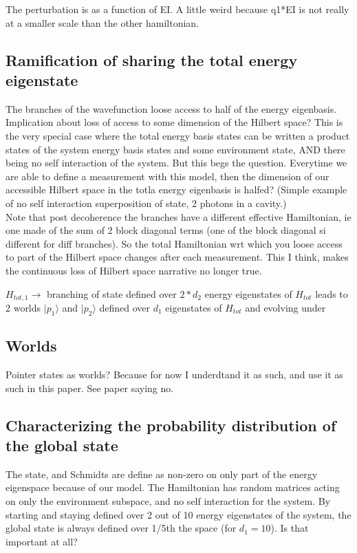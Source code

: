 \documentclass{article}
\begin{document}
The perturbation is as a function of EI.
A little weird because q1*EI is not really at a smaller scale than the other hamiltonian.


\subsection{Ramification of sharing the total energy eigenstate}
The branches of the wavefunction loose access to half of the energy eigenbasis. 
Implication about loss of access to some dimension of the Hilbert space? 
This is the very special case where the total energy basis states can be written a product states of the system energy basis states and some environment state, AND there being no self interaction of the system.
But this begs the question. Everytime we are able to define a measurement with this model, then the dimension of our accessible Hilbert space in the totla energy eigenbasis is halfed? (Simple example of no self interaction superposition of state, 2 photons in a cavity.) \\
Note that post decoherence the branches have a different effective Hamiltonian, ie one made of the sum of 2 block diagonal terms (one of the block diagonal si different for diff branches). So the total Hamiltonian wrt which you loose access to part of the Hilbert space changes after each measurement. This I think, makes the continuous loss of Hilbert space narrative no longer true. 

$H_{tot,1}\rightarrow$ branching of state defined over $2*d_2$ energy eigenstates of $H_{tot}$ leads to 2 worlds $|p_1\rangle$ and $|p_2\rangle$  defined over $d_1$ eigenstates of $H_{tot}$ and evolving under 



\subsection{Worlds}

Pointer states as worlds? Because for now I underdtand it as such, and use it as such in this paper.
See paper saying no.



\subsection{Characterizing the probability distribution of the global state}

The state, and Schmidts are define as non-zero on only part of the energy eigenspace because of our model. The Hamiltonian has random matrices acting on only the environment subspace, and no self interaction for the system. By starting and staying defined over 2 out of 10 energy eigenstates of the system, the global state is always defined over 1/5th the space (for $d_1=10$). Is that important at all? \\
\end{document}
